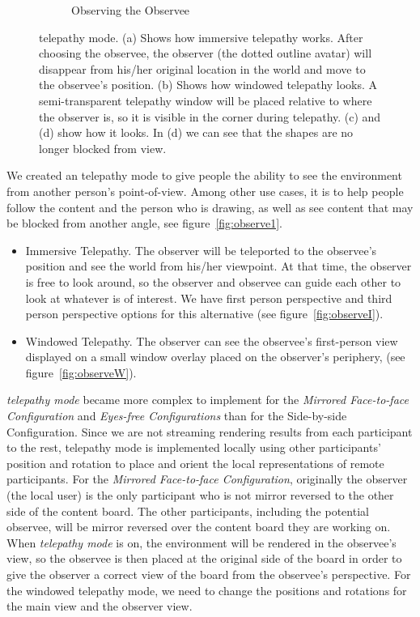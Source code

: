 \documentclass[chi_draft]{sigchi}
\begin{document}
\begin{figure}
\begin{subfigure}[b]{0.4\columnwidth}
        \caption{Observing the Observee}
        \label{fig:observe2}
    \end{subfigure}
    \caption{telepathy mode. (a) Shows how immersive telepathy works. After choosing the observee, the observer (the dotted outline avatar) will disappear from his/her original location in the world and move to the observee's position. (b) Shows how windowed telepathy looks. A semi-transparent telepathy window will be placed relative to where the observer is, so it is visible in the corner during telepathy. (c) and (d) show how it looks. In (d) we can see that the shapes are no longer blocked from view.}\label{fig:observe}
\end{figure}

We created an telepathy mode to give people the ability to see the environment from another person's point-of-view. Among other use cases, it is to help people follow the content and the person who is drawing, as well as see content that may be blocked from another angle, see figure~\ref{fig:observe1}.
\begin{itemize}
    \item Immersive Telepathy. The observer will be teleported to the observee's position and see the world from his/her viewpoint. At that time, the observer is free to look around, so the observer and observee can guide each other to look at whatever is of interest. We have first person perspective and third person perspective options for this alternative (see figure~\ref{fig:observeI}).
    \item Windowed Telepathy. The observer can see the observee's first-person view displayed on a small window overlay placed on the observer's periphery, (see figure~\ref{fig:observeW}).
\end{itemize}
\textit{telepathy mode} became more complex to implement for the \textit{Mirrored Face-to-face Configuration} and \textit{Eyes-free Configurations} than for the {Side-by-side Configuration}. Since we are not streaming rendering results from each participant to the rest, telepathy mode is implemented locally using other participants' position and rotation to place and orient the local representations of remote participants. For the \textit{Mirrored Face-to-face Configuration}, originally the observer (the local user) is the only participant who is not mirror reversed to the other side of the content board. The other participants, including the potential observee, will be mirror reversed over the content board they are working on. When \textit{telepathy mode} is on, the environment will be rendered in the observee's view, so the observee is then placed at the original side of the board in order to give the observer a correct view of the board from the observee's perspective. For the windowed telepathy mode, we need to change the positions and rotations for the main view and the observer view.
\end{document}
